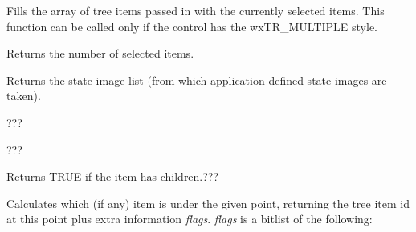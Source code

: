 \label{wxtreelistctrlgetselections}


Fills the array of tree items passed in with the currently selected items. This
function can be called only if the control has the wxTR\_MULTIPLE style.

Returns the number of selected items.



\label{wxtreelistctrlgetstateimagelist}


Returns the state image list (from which application-defined state images are taken).

\label{wxtreelistctrlgetwindowstyle}


???

\label{wxtreelistctrlgetwindowstyleflag}


???

\label{wxtreelistctrlhaschildren}


Returns TRUE if the item has children.???

\label{wxtreelistctrlhittest}




Calculates which (if any) item is under the given point, returning the tree item
id at this point plus extra information {\it flags}. {\it flags} is a bitlist of the following:

